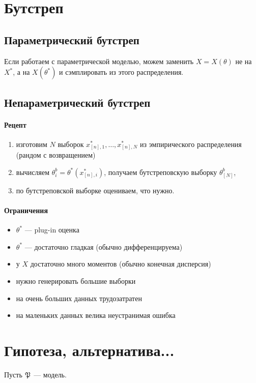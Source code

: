 \documentclass[11pt]{book}
\begin{document}
\section{Бутстреп}
\subsection{Параметрический бутстреп}
Если работаем с параметрической моделью, можем заменить $X=X(\theta)$ не на $X^*$, а на $X(\theta^*)$ и сэмплировать из этого распределения.
\subsection{Непараметрический бутстреп }
\paragraph{Рецепт}
\begin{enumerate}
	\item изготовим $N$ выборок $x^*_{[n], 1}, \ldots , x^*_{[n], N}$ из эмпирического распределения (рандом с возвращением)
	\item вычисляем $\theta^{b}_{i} = \theta^*(x^*_{[n], i})$, получаем бутстреповскую выборку $\theta^{b}_{[N]}$,
	\item по бутстреповской выборке оцениваем, что нужно.
\end{enumerate}
\paragraph{Ограничения}
\begin{itemize}
	\item $\theta^*$ --- plug-in оценка
    \item $\theta^*$ --- достаточно гладкая (обычно дифференцируема)
	\item у  $X$ достаточно много моментов (обычно конечная дисперсия)
	\item нужно генерировать большие выборки
	\item на очень больших данных трудозатратен
	\item на маленьких данных велика неустранимая ошибка
\end{itemize}

\section{Гипотеза, альтернатива...}
Пусть $\mathfrak{P}$ --- модель.
\end{document}
